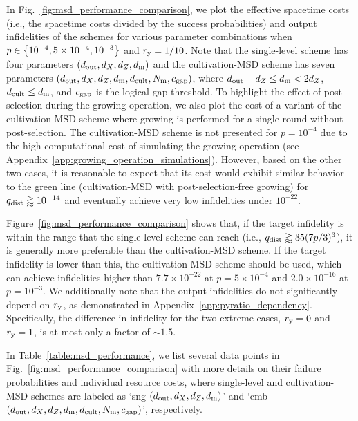 \documentclass[
 prx,
 reprint,
 superscriptaddress,
 longbibliography,
 dvipsnames
]{revtex4-2}
\begin{document}
In Fig.~\ref{fig:msd_performance_comparison}, we plot the effective spacetime costs (i.e., the spacetime costs divided by the success probabilities) and output infidelities of the schemes for various parameter combinations when $p \in \qty{10^{-4}, 5 \times 10^{-4}, 10^{-3}}$ and $r_{\mathrm{y}} = 1/10$.
Note that the single-level scheme has four parameters $(d_{\mathrm{out}}, {d_X}, {d_Z}, d_{\mathrm{m}})$ and the cultivation-MSD scheme has seven parameters $(d_{\mathrm{out}}, {d_X}, {d_Z}, d_{\mathrm{m}}, d_\mathrm{cult}, N_{\mathrm{m}}, c_{\mathrm{gap}})$, where $d_{\mathrm{out}} - {d_Z} \leq d_{\mathrm{m}} < 2{d_Z}$, $d_\mathrm{cult} \leq d_{\mathrm{m}}$, and $c_{\mathrm{gap}}$ is the logical gap threshold.
To highlight the effect of post-selection during the growing operation, we also plot the cost of a variant of the cultivation-MSD scheme where growing is performed for a single round without post-selection.
The cultivation-MSD scheme is not presented for $p = 10^{-4}$ due to the high computational cost of simulating the growing operation (see Appendix~\ref{app:growing_operation_simulations}).
However, based on the other two cases, it is reasonable to expect that its cost would exhibit similar behavior to the green line (cultivation-MSD with post-selection-free growing) for $q_{\mathrm{dist}} \gtrapprox 10^{-14}$ and eventually achieve very low infidelities under $10^{-22}$.

Figure~\ref{fig:msd_performance_comparison} shows that, if the target infidelity is within the range that the single-level scheme can reach (i.e., $q_{\mathrm{dist}} \gtrapprox 35(7p/3)^3$), it is generally more preferable than the cultivation-MSD scheme.
If the target infidelity is lower than this, the cultivation-MSD scheme should be used, which can achieve infidelities higher than $7.7 \times 10^{-22}$ at $p = 5 \times 10^{-4}$ and $2.0 \times 10^{-16}$ at $p = 10^{-3}$.
We additionally note that the output infidelities do not significantly depend on $r_{\mathrm{y}}$, as demonstrated in Appendix~\ref{app:pyratio_dependency}. 
Specifically, the difference in infidelity for the two extreme cases, $r_{\mathrm{y}} = 0$ and $r_{\mathrm{y}} = 1$, is at most only a factor of $\sim 1.5$.

In Table~\ref{table:msd_performance}, we list several data points in Fig.~\ref{fig:msd_performance_comparison} with more details on their failure probabilities and individual resource costs, where single-level and cultivation-MSD schemes are labeled as `sng-$(d_{\mathrm{out}}, {d_X}, {d_Z}, d_{\mathrm{m}})$' and `cmb-$(d_{\mathrm{out}}, {d_X}, {d_Z}, d_{\mathrm{m}}, d_\mathrm{cult}, N_{\mathrm{m}}, c_{\mathrm{gap}})$', respectively.
\end{document}
